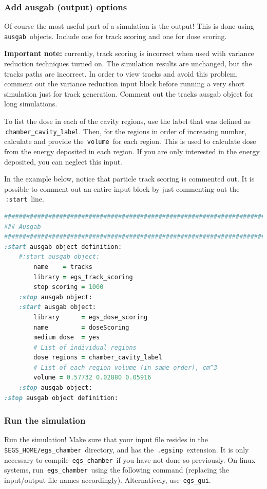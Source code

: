\documentclass[12pt,twoside]{article}
\begin{document}
\subsubsection{Add ausgab (output) options}
Of course the most useful part of a simulation is the output! This is done
using \,\Verb|ausgab|\, objects. Include one for track scoring and one for
dose scoring.

\textbf{Important note:} currently, track scoring is incorrect when used with variance
reduction techniques turned on. The simulation results are unchanged, but the
tracks paths are incorrect. In order to view tracks and avoid this problem,
comment out the variance reduction input block before running a very short
simulation just for track generation. Comment out the tracks ausgab object
for long simulations.

To list the dose in each of the cavity regions, use the label that was defined
as \\
\,\Verb|chamber_cavity_label|. Then, for the regions in order of increasing
number, calculate and provide the
\,\Verb|volume|\, for each region. This is used to calculate dose from the
energy deposited in each region. If you are only interested in the energy
deposited, you can neglect this input.

In the example below, notice that particle track scoring is commented out.
It is possible to comment out an entire input block by just commenting out the
\,\Verb|:start|\, line.

{\small
\begin{lstlisting}[language=ruby,backgroundcolor=\color{white}]
##############################################################################
### Ausgab
##############################################################################
:start ausgab object definition:
    #:start ausgab object:
        name    = tracks
        library = egs_track_scoring
        stop scoring = 1000
    :stop ausgab object:
    :start ausgab object:
        library      = egs_dose_scoring
        name         = doseScoring
        medium dose  = yes
        # List of individual regions
        dose regions = chamber_cavity_label
        # List of each region volume (in same order), cm^3
        volume = 0.57732 0.02880 0.05916
    :stop ausgab object:
:stop ausgab object definition:
\end{lstlisting}
}


\subsubsection{Run the simulation}
Run the simulation! Make sure that your input file resides in the \,\Verb|$EGS_HOME/egs_chamber|\, directory, and has the \,\Verb|.egsinp|\, extension.
It is only necessary to compile \,\Verb|egs_chamber|\, if you have not done
so previously. On linux systems, run \,\Verb|egs_chamber|\, using the following
command (replacing the input/output file names accordingly). Alternatively,
use \,\Verb|egs_gui|.
\end{document}
